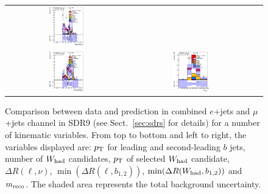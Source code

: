 \begin{figure}[htbp]
\begin{center}
\begin{tabular}{ccc}
\includegraphics[width=0.30\textwidth]{appendices/figures/sdrs/VLQAna_WbX_MinDRlb_ELEMUONCR9_1W_NOMINAL.eps} \\
\includegraphics[width=0.30\textwidth]{appendices/figures/sdrs/VLQAna_WbX_MinDRWb_ELEMUONCR9_1W_NOMINAL.eps} &
\includegraphics[width=0.30\textwidth]{appendices/figures/sdrs/VLQAna_WbX_1W_MWb_4_ELEMUONCR9_1W_NOMINAL.eps} & \\
\end{tabular}\caption{\small {Comparison between data and prediction in combined $e$+jets and $\mu$+jets channel in SDR9 (see Sect.~\ref{sec:sdrs} for details) 
for a number of kinematic variables. From top to bottom and left to right, the variables displayed are: $\pt$ for leading and second-leading $b$ jets,
number of $W_{\rm had}$  candidates, $\pt$ of selected $W_{\rm had}$  candidate, $\Delta R(\ell,\nu)$, $\min(\Delta R(\ell, b_{1,2}))$, 
$\min(\Delta R(W_{\rm had}, b_{1,2}))$ and $m_{\rm reco}$.
The shaded area represents the total background uncertainty.}}
\label{fig:ELEMUONCR9_3}
\end{center}
\end{figure}                                                                             
